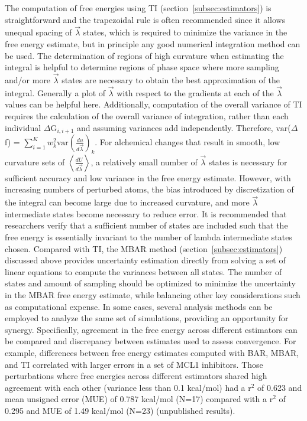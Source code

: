 \documentclass[9pt,bestpractices]{livecoms}
\newcommand{\expect}[1]{\left\langle{#1}\right\rangle}
\begin{document}
The computation of free energies using TI (section~\ref{subsec:estimators}) is straightforward and the trapezoidal rule is often recommended since it allows unequal spacing of $\vec{\lambda}$ states, which is required to minimize the variance in the free energy estimate, but in principle any good numerical integration method can be used. 
The determination of regions of high curvature when estimating the integral is helpful to determine regions of phase space where more sampling and/or more $\vec{\lambda}$ states are necessary to obtain the best approximation of the integral. Generally a plot of $\vec{\lambda}$ with respect to the gradients at each of the $\vec{\lambda}$ values can be helpful here. 
Additionally, computation of the overall variance of TI requires the calculation of the overall variance of integration, rather than each individual $\Delta$G$_{i,i+1}$ and assuming variances add independently. 
Therefore, $\mathrm{var}$($\Delta$f) = $\sum_{i=1}^{K}w_{k}^2 \mathrm{var}(\frac{du}{d\vec{\lambda}})_{k}$.
%
For alchemical changes that result in smooth, low curvature sets of $\expect{\frac{dU}{d\vec{\lambda}}}$, a relatively small number of $\vec{\lambda}$ states is necessary for sufficient accuracy and low variance in the free energy estimate. 
However, with increasing numbers of perturbed atoms, the bias introduced by discretization of the integral can become large due to increased curvature, and more $\vec{\lambda}$ intermediate states become necessary to reduce error.
It is recommended that researchers verify that a sufficient number of states are included such that the free energy is essentially invariant to the number of lambda intermediate states chosen.
%
Compared with TI, the MBAR method (section~\ref{subsec:estimators}) discussed above provides uncertainty estimation directly from solving a set of linear equations to compute the variances between all states. 
The number of states and amount of sampling should be optimized to minimize the uncertainty in the MBAR free energy estimate, while balancing other key considerations such as computational expense. 
%
In some cases, several analysis methods can be employed to analyze the same set of simulations, providing an opportunity for synergy. Specifically, agreement in the free energy across different estimators can be compared and discrepancy between estimates used to assess convergence.
For example, differences between free energy estimates computed with BAR, MBAR, and TI correlated with larger errors in a set of MCL1 inhibitors.
Those perturbations where free energies across different estimators shared high agreement with each other (variance less than 0.1 kcal/mol) had a r$^2$ of 0.623 and mean unsigned error (MUE) of 0.787 kcal/mol (N=17) compared with a r$^2$ of 0.295 and MUE of 1.49 kcal/mol (N=23) (unpublished results).
\end{document}
